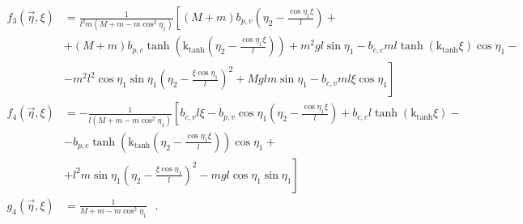 \begin{align}
f_3(\vec{\eta},\xi) &= \frac{1}{ l^2 m (M + m - m \cos^2 \eta_1) }
\left[
(M + m) b_{p,v} \left(\eta_2 - \frac{\cos \eta_1 \xi}{l}\right) + \right. \nonumber \\
&+ (M + m) b_{p,c} \tanh\left(\mathrm{k}_{\mathrm{tanh}} \left(\eta_2 - \frac{ \cos \eta_1 \xi}{l}\right)\right) + m^2 g l \sin \eta_1 - b_{c,c} m l \tanh\left(\mathrm{k}_{\mathrm{tanh}} \xi\right) \cos \eta_1 - \nonumber \\
&- \left. m^2 l^2 \cos \eta_1 \sin \eta_1 \left(\eta_2 - \frac{\xi \cos \eta_1}{l}\right)^2 + M g l m \sin \eta_1 - b_{c,v} m l \xi \cos \eta_1
\right] \\
%
%
f_4(\vec{\eta},\xi) &= -\frac{1}{ l (M + m - m \cos^2 \eta_1) } \left[   b_{c,v} l \xi - b_{p,v} \cos \eta_1 \left(\eta_2 - \frac{\cos \eta_1 \xi}{l}\right) + b_{c,c} l \tanh\left(\mathrm{k}_{\mathrm{tanh}} \xi\right) - \right. \nonumber \\
&- b_{p,c} \tanh\left(\mathrm{k}_{\mathrm{tanh}} \left(\eta_2 - \frac{ \cos \eta_1 \xi}{l}\right)\right) \cos \eta_1 + \nonumber \\
&+ \left. l^2 m \sin \eta_1 \left(\eta_2 - \frac{\xi \cos \eta_1}{l}\right)^2 - m g l \cos \eta_1 \sin \eta_1  \right] \\
%
%
g_4(\vec{\eta},\xi) &= \frac{1}{M + m - m \cos^2 \eta_1 }
\ \ \ .
\label{eq:f3f4g4} \\ \nonumber
\end{align}
\endgroup \vspace{-44pt}

